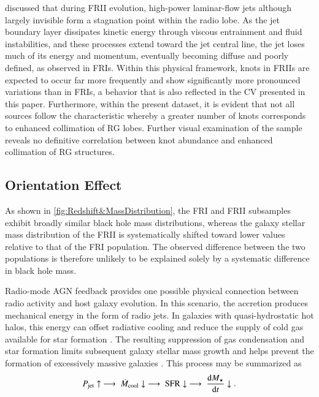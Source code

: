 \documentclass{aa}
\begin{document}
\cite{an_dynamic_2012} discussed that during FRII evolution, high-power laminar-flow jets \textemdash although largely invisible \textemdash form a stagnation point within the radio lobe. As the jet boundary layer dissipates kinetic energy through viscous entrainment and fluid instabilities, and these processes extend toward the jet central line, the jet loses much of its energy and momentum, eventually becoming diffuse and poorly defined, as observed in FRIs.
Within this physical framework, knots in FRIIs are expected to occur far more frequently and show significantly more pronounced variations than in FRIs, a behavior that is also reflected in the CV presented in this paper.
Furthermore, within the present dataset, it is evident that not all sources follow the characteristic whereby a greater number of knots corresponds to enhanced collimation of RG lobes. Further visual examination of the sample reveals no definitive correlation between knot abundance and enhanced collimation of RG structures.



\subsection{Orientation Effect} \label{subsec:Section5_4}
As shown in \autoref{fig:Redshift&MassDistribution}, the FRI and FRII subsamples exhibit broadly similar black hole mass distributions, whereas the galaxy stellar mass distribution of the FRII is systematically shifted toward lower values relative to that of the FRI population. The observed difference between the two populations is therefore unlikely to be explained solely by a systematic difference in black hole mass. 

Radio-mode AGN feedback provides one possible physical connection between radio activity and host galaxy evolution. 
In this scenario, the accretion produces mechanical energy in the form of radio jets. 
In galaxies with quasi-hydrostatic hot halos, this energy can offset radiative cooling and reduce the supply of cold gas available for star formation \cite{Somerville & Davé - 2015, Bower et al. 2006}. 
The resulting suppression of gas condensation and star formation limits subsequent galaxy stellar mass growth and helps prevent the formation of excessively massive galaxies \cite{Croton et al. 2006, Lagos et al. 2008}. This process may be summarized as
\[
P_{\rm jet}\uparrow
\;\longrightarrow\;
\dot{M}_{\rm cool}\downarrow
\;\longrightarrow\;
{\rm SFR}\downarrow
\;\longrightarrow\;
\frac{{\rm d}M_\star}{{\rm d}t}\downarrow .
\]
\end{document}
